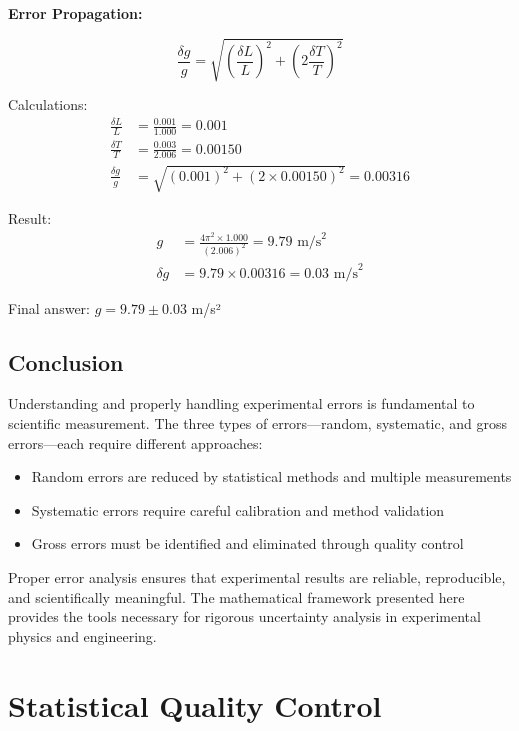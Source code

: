 \documentclass[twoside]{book}
\begin{document}
\textbf{Error Propagation:}

\begin{equation*}
\frac{\delta g}{g} = \sqrt{\left(\frac{\delta L}{L}\right)^2 + \left(2\frac{\delta T}{T}\right)^2}
\end{equation*}

Calculations:
\begin{align*}
\frac{\delta L}{L} &= \frac{0.001}{1.000} = 0.001 \\
\frac{\delta T}{T} &= \frac{0.003}{2.006} = 0.00150 \\
\frac{\delta g}{g} &= \sqrt{(0.001)^2 + (2 \times 0.00150)^2} = 0.00316
\end{align*}

Result:
\begin{align*}
g &= \frac{4\pi^2 \times 1.000}{(2.006)^2} = 9.79 \text{ m/s}^2 \\
\delta g &= 9.79 \times 0.00316 = 0.03 \text{ m/s}^2
\end{align*}

Final answer: $g = 9.79 \pm 0.03$ m/s²

\section{Conclusion}

Understanding and properly handling experimental errors is fundamental to scientific measurement. The three types of errors—random, systematic, and gross errors—each require different approaches:

\begin{itemize}
\item Random errors are reduced by statistical methods and multiple measurements
\item Systematic errors require careful calibration and method validation
\item Gross errors must be identified and eliminated through quality control
\end{itemize}

Proper error analysis ensures that experimental results are reliable, reproducible, and scientifically meaningful. The mathematical framework presented here provides the tools necessary for rigorous uncertainty analysis in experimental physics and engineering.

\chapter{Statistical Quality Control}
\end{document}
